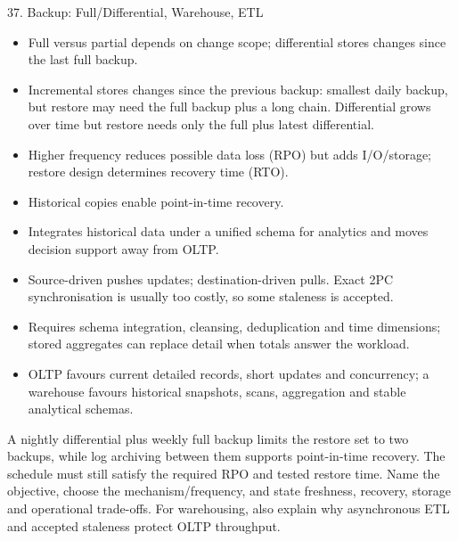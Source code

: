 \begin{topic}{37. Backup: Full/Differential, Warehouse, ETL}
\begin{itemize}
  \item Full versus partial depends on change scope; differential stores changes since the last full backup.
  \item Incremental stores changes since the previous backup: smallest daily backup, but restore may need the full backup plus a long chain. Differential grows over time but restore needs only the full plus latest differential.
  \item Higher frequency reduces possible data loss (RPO) but adds I/O/storage; restore design determines recovery time (RTO).
  \item Historical copies enable point-in-time recovery.
\end{itemize}
\begin{itemize}
  \item Integrates historical data under a unified schema for analytics and moves decision support away from OLTP.
  \item Source-driven pushes updates; destination-driven pulls. Exact 2PC synchronisation is usually too costly, so some staleness is accepted.
  \item Requires schema integration, cleansing, deduplication and time dimensions; stored aggregates can replace detail when totals answer the workload.
  \item OLTP favours current detailed records, short updates and concurrency; a warehouse favours historical snapshots, scans, aggregation and stable analytical schemas.
\end{itemize}
\worked A nightly differential plus weekly full backup limits the restore set to two backups, while log archiving between them supports point-in-time recovery. The schedule must still satisfy the required RPO and tested restore time.
\answer Name the objective, choose the mechanism/frequency, and state freshness, recovery, storage and operational trade-offs. For warehousing, also explain why asynchronous ETL and accepted staleness protect OLTP throughput.
\end{topic}
